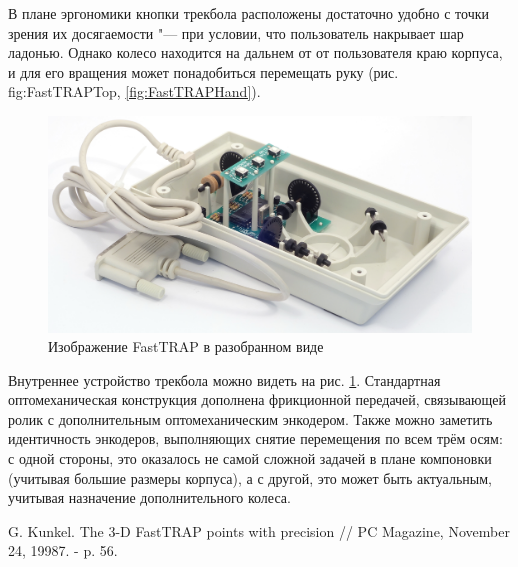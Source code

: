 \documentclass[11pt, a4paper]{article}
\begin{document}
В плане эргономики кнопки трекбола расположены достаточно удобно с точки зрения их досягаемости "--- при условии, что пользователь накрывает шар ладонью. Однако колесо находится на дальнем от от пользователя краю корпуса, и для его вращения может понадобиться перемещать руку (рис. {fig:FastTRAPTop}, \ref{fig:FastTRAPHand}).


\begin{figure}[h]
    \centering
    \includegraphics[scale=0.6]{1987_microspeed_fasttrap/inside_15.jpg}
    \caption{Изображение FastTRAP в разобранном виде}
    \label{fig:FastTRAPInside}
\end{figure}

Внутреннее устройство трекбола можно видеть на рис. \ref{fig:FastTRAPInside}.
Стандартная оптомеханическая конструкция дополнена фрикционной передачей, связывающей ролик с дополнительным оптомеханическим энкодером. Также можно заметить идентичность энкодеров, выполняющих снятие перемещения по всем трём осям: с одной стороны, это оказалось не самой сложной задачей в плане компоновки (учитывая большие размеры корпуса), а с другой, это может быть актуальным, учитывая назначение дополнительного колеса.

\begin{thebibliography}{9}
 G. Kunkel. The 3-D FastTRAP points with precision // PC Magazine, November 24, 19987. - p. 56.
\end{thebibliography}
\end{document}

